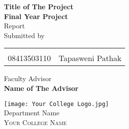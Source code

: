 \begin{titlepage}

\begin{center}



\Large \textbf {Title of The Project}\\[0.5in]
\textup{\small {\bf Final Year Project } \\ Report}\\[0.2in]
     

\normalsize Submitted by \\
\begin{table}[h]
\centering
\begin{tabular}{lr}\hline \\
08413503110 & Tapasweni Pathak \\ \hline 
\end{tabular}
\end{table}

\vspace{.1in}
Faculty Advisor\\
{\textbf{Name of The Advisor}}\\[0.2in]
\vfill

\texttt{[image: Your College Logo.jpg]}\\[0.1in]
\Large{Department Name}\\
\normalsize
\textsc{Your College Name}\\
\vspace{0.2cm}

\end{center}

\end{titlepage}
